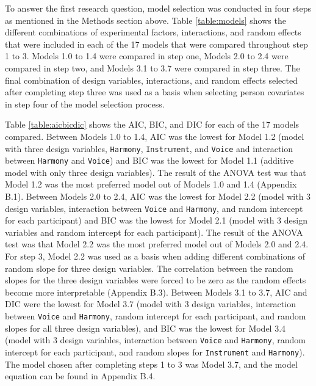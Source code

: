 \documentclass{article}
\begin{document}
To answer the first research question, model selection was conducted in four steps as mentioned in the Methods section above. Table \ref{table:models} shows the different combinations of experimental factors, interactions, and random effects that were included in each of the 17 models that were compared throughout step 1 to 3. Models 1.0 to 1.4 were compared in step one, Models 2.0 to 2.4 were compared in step two, and Models 3.1 to 3.7 were compared in step three. The final combination of design variables, interactions, and random effects selected after completing step three was used as a basis when selecting person covariates in step four of the model selection process.
\bigbreak

Table \ref{table:aicbicdic} shows the AIC, BIC, and DIC for each of the 17 models compared. Between Models 1.0 to 1.4, AIC was the lowest for Model 1.2 (model with three design variables, \texttt{Harmony}, \texttt{Instrument}, and \texttt{Voice} and interaction between \texttt{Harmony} and \texttt{Voice}) and BIC was the lowest for Model 1.1 (additive model with only three design variables). The result of the ANOVA test was that Model 1.2 was the most preferred model out of Models 1.0 and 1.4 (Appendix B.1). Between Models 2.0 to 2.4, AIC was the lowest for Model 2.2 (model with 3 design variables, interaction between \texttt{Voice} and \texttt{Harmony}, and random intercept for each participant) and BIC was the lowest for Model 2.1 (model with 3 design variables and random intercept for each participant). The result of the ANOVA test was that Model 2.2 was the most preferred model out of Models 2.0 and 2.4. For step 3, Model 2.2 was used as a basis when adding different combinations of random slope for three design variables. The correlation between the random slopes for the three design variables were forced to be zero as the random effects become more interpretable (Appendix B.3). Between Models 3.1 to 3.7, AIC and DIC were the lowest for Model 3.7 (model with 3 design variables, interaction between \texttt{Voice} and \texttt{Harmony}, random intercept for each participant, and random slopes for all three design variables), and BIC was the lowest for Model 3.4 (model with 3 design variables, interaction between \texttt{Voice} and \texttt{Harmony}, random intercept for each participant, and random slopes for \texttt{Instrument} and \texttt{Harmony}). The model chosen after completing steps 1 to 3 was Model 3.7, and the model equation can be found in Appendix B.4.
\end{document}
